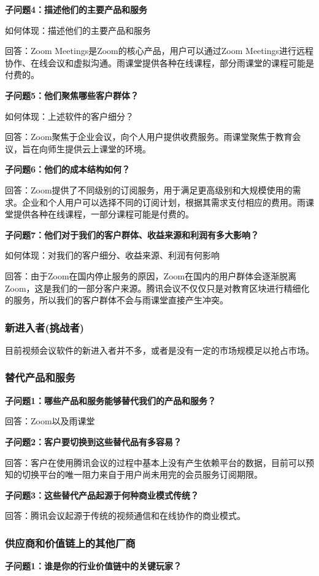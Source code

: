 \documentclass[a4paper,12pt]{article}
\begin{document}
    \textbf{子问题4：描述他们的主要产品和服务}

    如何体现：描述他们的主要产品和服务

    回答：Zoom Meetings是Zoom的核心产品，用户可以通过Zoom Meetings进行远程协作、在线会议和虚拟沟通。雨课堂提供各种在线课程，部分雨课堂的课程可能是付费的。
    
    \textbf{子问题5：他们聚焦哪些客户群体？}

    如何体现：上述软件的客户细分？

    回答：Zoom聚焦于企业会议，向个⼈⽤户提供收费服务。⾬课堂聚焦于教育会议，旨在向师⽣提供云上课堂的环境。
    
    \textbf{子问题6：他们的成本结构如何？}

    回答：Zoom提供了不同级别的订阅服务，用于满足更高级别和大规模使用的需求。企业和个人用户可以选择不同的订阅计划，根据其需求支付相应的费用。雨课堂提供各种在线课程，一部分课程可能是付费的。
    
    \textbf{子问题7：他们对于我们的客户群体、收益来源和利润有多大影响？}

    如何体现：对我们的客户细分、收益来源、利润有何影响

    回答：由于Zoom在国内停⽌服务的原因，Zoom在国内的⽤户群体会逐渐脱离Zoom，这是我们的⼀部分客户来源。腾讯会议不仅仅只是对教育区块进⾏精细化的服务，所以我们的客户群体不会与雨课堂直接产⽣冲突。
    
    \subsubsection{新进入者(挑战者)}
    目前视频会议软件的新进入者并不多，或者是没有⼀定的市场规模足以抢占市场。
    \subsubsection{替代产品和服务}
    \textbf{子问题1：哪些产品和服务能够替代我们的产品和服务？}

    回答：Zoom以及⾬课堂

    \textbf{子问题2：客户要切换到这些替代品有多容易？}

    回答：客户在使⽤腾讯会议的过程中基本上没有产⽣依赖平台的数据，⽬前可以预知的切换平台的唯一阻⼒来⾃于⽤户尚未⽤完的会员服务订阅期限。

    \textbf{子问题3：这些替代产品起源于何种商业模式传统？}

    回答：腾讯会议起源于传统的视频通信和在线协作的商业模式。
    
    \subsubsection{供应商和价值链上的其他厂商}
    \textbf{子问题1：谁是你的行业价值链中的关键玩家？}
\end{document}

